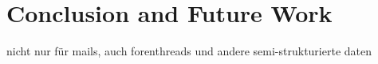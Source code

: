 \documentclass{llncs}
\newcommand{\dummyfig}[3]{
	\centering
	\fbox{
		\begin{minipage}[c][#1\textheight][c]{#2\textwidth}
			\centering{#3}
		\end{minipage}
	}
}
\begin{document}
\section{Conclusion and Future Work}
nicht nur für mails, auch forenthreads und andere semi-strukturierte daten





 
\end{document}
